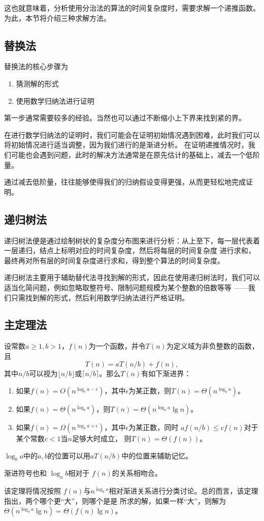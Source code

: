 这也就意味着，分析使用分治法的算法的时间复杂度时，需要求解一个递推函数。为此，本节将介绍三种求解方法。
\subsection{替换法}
替换法的核心步骤为
\begin{enumerate}
    \item 猜测解的形式
    \item 使用数学归纳法进行证明
\end{enumerate}
第一步通常需要较多的经验。当然也可以通过不断缩小上下界来找到紧的界。

在进行数学归纳法的证明时，我们可能会在证明初始情况遇到困难，此时我们可以将初始情况进行适当调整，因为我们进行的是渐进分析。
在证明递推情况时，我们可能也会遇到问题，此时的解决方法通常是在原先估计的基础上，减去一个低阶量。
\begin{myrmk}
    通过减去低阶量，往往能够使得我们的归纳假设变得更强，从而更轻松地完成证明。
\end{myrmk}
\subsection{递归树法}
递归树法便是通过绘制树状的复杂度分布图来进行分析：从上至下，每一层代表着一层递归，结点上标明对应的时间复杂度，然后将每层的时间复杂度
进行求和，最终再对所有层的时间复杂度进行求和，得到整个算法的时间复杂度。

递归树法主要用于辅助替代法寻找到解的形式，因此在使用递归树法时，我们可以适当化简问题，例如忽略取整符号、限制问题规模为某个整数的倍数等等
——我们只需找到解的形式，然后利用数学归纳法进行严格证明。
\subsection{主定理法}
\begin{mythm}
    设常数$a\geq 1,b>1$，$f(n)$为一个函数，并令$T(n)$为定义域为非负整数的函数，且
    \[T(n)=aT(n/b)+f(n),\]
    其中$n/b$可以视为$\lfloor n/b\rfloor$或$\lceil n/b\rceil$。那么$T(n)$有如下渐进界：
    \begin{enumerate}
        \item 如果$f(n)=O(n^{\log_ba-\epsilon})$，其中$\epsilon$为某正数，则$T(n)=\Theta(n^{\log_ba})$。
        \item 如果$f(n)=\Theta(n^{\log_ba})$，则$T(n)=\Theta(n^{\log_ba}\lg n)$。
        \item 如果$f(n)=\Omega(n^{\log_ba+\epsilon})$，其中$\epsilon$为某正数，同时
       $af(n/b)\leq cf(n)$对于某个常数$c<1$当$n$足够大时成立， 则$T(n)=\Theta(f(n))$。
    \end{enumerate}
\end{mythm}
\begin{myrmk}
   $\log_ba$中的$a,b$的位置可以用$aT(n/b)$中的位置来辅助记忆。

   渐进符号也和 $\log_ab$相对于 $f(n)$的关系相吻合。
\end{myrmk}
该定理将情况按照 $f(n)$与$n^{\log_ba}$相对渐进关系进行分类讨论。总的而言，该定理指出，两个哪个更“大”，则哪个是是
所求的解，如果一样“大”，则解为$\Theta(n^{\log_ba}\lg n)=\Theta(f(n)\lg n)$。

